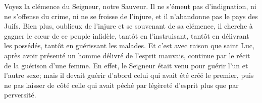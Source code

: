 Voyez la clémence du Seigneur, notre Sauveur.
Il ne s’émeut pas d’indignation, ni ne s’offense du crime,
	ni ne se froisse de l’injure, et il n’abandonne pas le pays des Juifs.
Bien plus, oublieux de l’injure et se souvenant de sa clémence,
	il cherche à gagner le cœur de ce peuple infidèle,
	tantôt en l’instruisant, tantôt en délivrant les possédés,
	tantôt en guérissant les malades.
Et c’est avec raison que saint Luc,
	après avoir présenté un homme délivré de l’esprit mauvais,
	continue par le récit de la guérison d’une femme.
En effet, le Seigneur était venu pour guérir l’un et l’autre sexe;
	mais il devait guérir d’abord celui qui avait été créé le premier,
	puis ne pas laisser de côté
		celle qui avait péché par légèreté d’esprit plus que par perversité.
